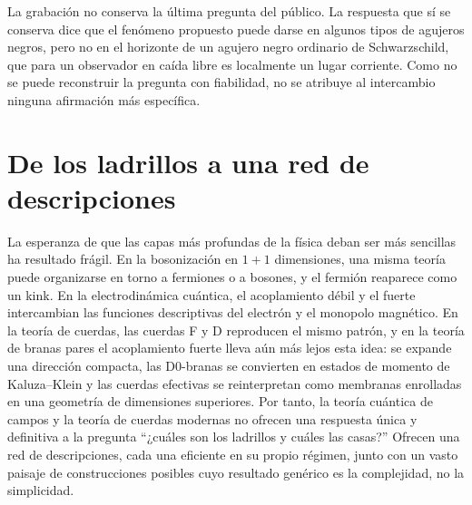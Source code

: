 
La grabación no conserva la última pregunta del público. La respuesta que sí se conserva dice que el fenómeno propuesto puede darse en algunos tipos de agujeros negros, pero no en el horizonte de un agujero negro ordinario de Schwarzschild, que para un observador en caída libre es localmente un lugar corriente. Como no se puede reconstruir la pregunta con fiabilidad, no se atribuye al intercambio ninguna afirmación más específica.

\section{De los ladrillos a una red de descripciones}

La esperanza de que las capas más profundas de la física deban ser más sencillas ha resultado frágil. En la bosonización en \(1+1\) dimensiones, una misma teoría puede organizarse en torno a fermiones o a bosones, y el fermión reaparece como un kink. En la electrodinámica cuántica, el acoplamiento débil y el fuerte intercambian las funciones descriptivas del electrón y el monopolo magnético. En la teoría de cuerdas, las cuerdas F y D reproducen el mismo patrón, y en la teoría de branas pares el acoplamiento fuerte lleva aún más lejos esta idea: se expande una dirección compacta, las D0-branas se convierten en estados de momento de Kaluza--Klein y las cuerdas efectivas se reinterpretan como membranas enrolladas en una geometría de dimensiones superiores. Por tanto, la teoría cuántica de campos y la teoría de cuerdas modernas no ofrecen una respuesta única y definitiva a la pregunta ``¿cuáles son los ladrillos y cuáles las casas?'' Ofrecen una red de descripciones, cada una eficiente en su propio régimen, junto con un vasto paisaje de construcciones posibles cuyo resultado genérico es la complejidad, no la simplicidad.
